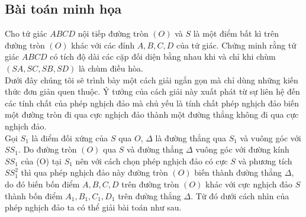 \subsection{Bài toán minh họa}

\begin{bt}%
Cho tứ giác $ABCD$ nội tiếp đường tròn $(O)$ và $S$ là một điểm bất kì trên đường tròn $(O)$ khác với các đỉnh $A, B, C, D$ của tứ giác. Chứng minh rằng tứ giác $ABCD$ có tích độ dài các cặp đối diện bằng nhau khi và chỉ khi chùm $(SA, SC, SB, SD)$ là chùm điều hòa.\\
Dưới đây chúng tôi sẽ trình bày một cách giải ngắn gọn mà chỉ dùng những kiến thức đơn giản quen thuộc. Ý tưởng của cách giải này xuất phát từ sự liên hệ đến các tính chất của phép nghịch đảo mà chủ yếu là tính chất phép nghịch đảo biến một đường tròn đi qua cực nghịch đảo thành một đường thẳng không đi qua cực nghịch đảo. \\
Gọi $S_1$ là điểm đối xứng của $S$ qua $O$, $\Delta$ là đường thẳng qua $S_1$ và vuông góc với $SS_1$. Do đường tròn $(O)$ qua $S$ và đường thẳng $\Delta$ vuông góc với đường kính $SS_1$ của (O) tại $S_1$ nên với cách chọn phép nghịch đảo có cực $S$ và phương tích $SS^2_1$ thì qua phép nghịch đảo này đường tròn $(O)$ biến thành đường thẳng $\Delta$, do đó biến bốn điểm $A, B, C, D$ trên đường tròn $(O)$ khác với cực nghịch đảo $S$ thành bốn điểm $A_1, B_1, C_1, D_1$ trên đường thẳng $\Delta$.
Từ đó dưới cách nhìn của phép nghịch đảo ta có thể giải bài toán như sau.
\end{bt}
